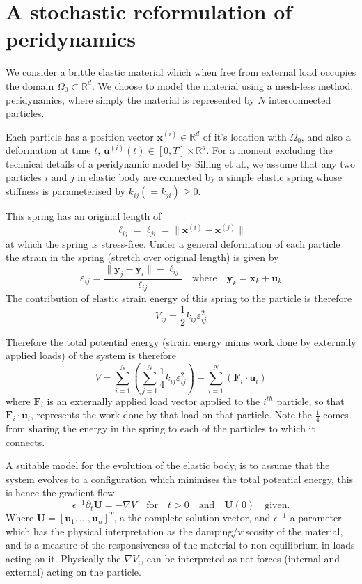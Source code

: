 \documentclass{article}
\begin{document}
\section{A stochastic reformulation of peridynamics}

We consider a brittle elastic material which when free from external load occupies the domain $\Omega_0 \subset \mathbb R^d$. We choose to model the material using a mesh-less method, peridynamics, where simply the material is represented by $N$ interconnected particles.

Each particle has a position vector $\textbf{x}^{(i)} \in \mathbb R^d$ of it's location with $\Omega_0$, and also a deformation at time $t$, $\textbf{u}^{(i)}(t) \in [0,T] \times \mathbb R^d$. For a moment excluding the technical details of a peridynamic model by Silling et al., we assume that any two particles $i$ and $j$ in elastic body are connected by a simple elastic spring whose stiffness is parameterised by $k_{ij} (= k_{ji}) \geq 0$. 

\noindent
This spring has an original length of
\begin{equation}
\ell_{ij} = \ell_{ji} = \| \textbf{x}^{(i)} - \textbf{x}^{(j)} \|
\end{equation}
at which the spring is stress-free. Under a general deformation of each particle the strain in the spring (stretch over original length) is given by
$$
\varepsilon_{ij} = \frac{\| \textbf{y}_j - \textbf{y}_i\| - \ell_{ij}}{\ell_{ij}} \quad \mbox{where} \quad \textbf{y}_k = \textbf{x}_k + \textbf{u}_k
$$
The contribution of elastic strain energy of this spring to the particle is therefore
$$
V_{ij} = \frac{1}{2} k_{ij} \varepsilon_{ij}^2
$$

\smallskip\noindent
Therefore the total potential energy (strain energy minus work done by externally applied loads) of the system is therefore
$$
V = \sum_{i=1}^N \left(\sum_{j=1}^N \frac{1}{4} k_{ij} \varepsilon_{ij}^2\right) - \sum_{i=1}^N \left(\textbf{F}_i \cdot \textbf{u}_i\right)
$$
where $\textbf{F}_i$ is an externally applied load vector applied to the $i^{th}$ particle, so that $\textbf{F}_i \cdot \textbf{u}_i$, represents the work done by that load on that particle. Note the $\frac{1}{4}$ comes from sharing the energy in the spring to each of the particles to which it connects. 

\smallskip\noindent
A suitable model for the evolution of the elastic body, is to assume that the system evolves to a configuration which minimises the total potential energy, this is hence the gradient flow
$$
\epsilon^{-1} \partial_t \textbf{U} = -\nabla V \quad \mbox{for} \quad t > 0 \quad \mbox{and} \quad \textbf{U}(0) \quad \mbox{given}.
$$
Where $\textbf{U} = [\textbf{u}_1,\ldots,\textbf{u}_n]^T$, a the complete solution vector, and $\epsilon^{-1}$ a parameter which has the physical interpretation as the damping/viscosity of the material, and is a measure of the responsiveness of the material to non-equilibrium in loads acting on it. Physically the $\nabla V_i$, can be interpreted as net forces (internal and external) acting on the particle.
\end{document}
